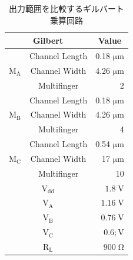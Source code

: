             \begin{table}[!b]
                \centering
                \caption{出力範囲を比較するギルバート乗算回路}
                \label{table:3_prev_com_param}
                \begin{tabular}{c|c|r}
                    \hline
                    \multicolumn{2}{c}{Gilbert}   & \multicolumn{1}{c}{Value}     \\
                    \hline\hline
                    &   Channel Length   &   0.18 $\mathrm{\mu m}$   \\
                    \cline{2-3}
                    $\mathrm{M_{A}}$   &   Channel Width   &   4.26 $\mathrm{\mu m}$   \\
                    \cline{2-3}
                        &   Multifinger   & 2    \\
                    \hline
                    &   Channel Length   &   0.18 $\mathrm{\mu m}$   \\
                    \cline{2-3}
                    $\mathrm{M_{B}}$   &   Channel Width   &   4.26 $\mathrm{\mu m}$   \\
                    \cline{2-3}
                        &   Multifinger   & 4    \\
                    \hline
                    &   Channel Length   &   0.54 $\mathrm{\mu m}$   \\
                    \cline{2-3}
                    $\mathrm{M_{C}}$   &   Channel Width   &   17 $\mathrm{\mu m}$   \\
                    \cline{2-3}
                        &   Multifinger   & 10    \\
                    \hline
                    \multicolumn{2}{c|}{$\mathrm{V_{dd}}$} &   $1.8\;\mathrm{V}$   \\
                    \hline
                    \multicolumn{2}{c|}{$\mathrm{V_{A}}$} &   $1.16\;\mathrm{V}$   \\
                    \hline
                    \multicolumn{2}{c|}{$\mathrm{V_{B}}$} &   $0.76\;\mathrm{V}$   \\
                    \hline
                    \multicolumn{2}{c|}{$\mathrm{V_{C}}$} &   $0.6;\mathrm{V}$   \\
                    \hline
                    \multicolumn{2}{c|}{$\mathrm{R_{L}}$} &   $900\;\mathrm{\Omega}$   \\
                    \hline
                \end{tabular}
            \end{table}
